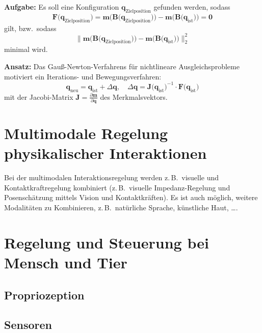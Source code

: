 \documentclass[a4paper, 11pt, accentcolor = tud3b]{tudreport}
\newcommand{\mat}[1]{\boldsymbol{#1}}
\renewcommand{\vec}[1]{\boldsymbol{#1}}
\newcommand{\bzw}{bzw.~}
\newcommand{\zB}{z.\,B.~}
\begin{document}
				\textbf{Aufgabe:}
				Es soll eine Konfiguration \( \vec{q}_\text{Zielposition} \) gefunden werden, sodass
				\begin{equation*}
					\vec{F}\big(\vec{q}_\text{Zielposition}\big) = \vec{m}\Big(\!\mat{B}\big(\vec{q}_\text{Zielposition}\big)\Big) - \vec{m}\Big(\!\mat{B}\big(\vec{q}_\text{ist}\big)\Big) = \vec{0}
				\end{equation*}
				gilt, \bzw sodass
				\begin{equation*}
					\Big\lVert \vec{m}\Big(\!\mat{B}\big(\vec{q}_\text{Zielposition}\big)\Big) - \vec{m}\Big(\!\mat{B}\big(\vec{q}_\text{ist}\big)\Big) \Big\rVert_2^2
				\end{equation*}
				minimal wird.
				
				\textbf{Ansatz:}
				Das Gauß-Newton-Verfahrens für nichtlineare Ausgleichsprobleme motiviert ein Iterations- und Bewegungsverfahren:
				\begin{equation*}
					\vec{q}_\text{neu} = \vec{q}_\text{ist} + \Delta\vec{q},\quad \Delta\vec{q} = \mat{J}\big(\vec{q}_\text{ist}\big)^{-1} \cdot \vec{F}\big(\vec{q}_\text{ist}\big)
				\end{equation*}
				mit der Jacobi-Matrix \( \mat{J} = \frac{\partial \vec{m}}{\partial \vec{q}} \) des Merkmalsvektors.

		\section{Multimodale Regelung physikalischer Interaktionen}
			Bei der multimodalen Interaktionsregelung werden \zB visuelle und Kontaktkraftregelung kombiniert (\zB visuelle Impedanz-Regelung und Posenschätzung mittels Vision und Kontaktkräften). Es ist auch möglich, weitere Modalitäten zu Kombinieren, \zB natürliche Sprache, künstliche Haut, \dots.

		\section{Regelung und Steuerung bei Mensch und Tier} %

			\subsection{Propriozeption} %

			\subsection{Sensoren} %
\end{document}
